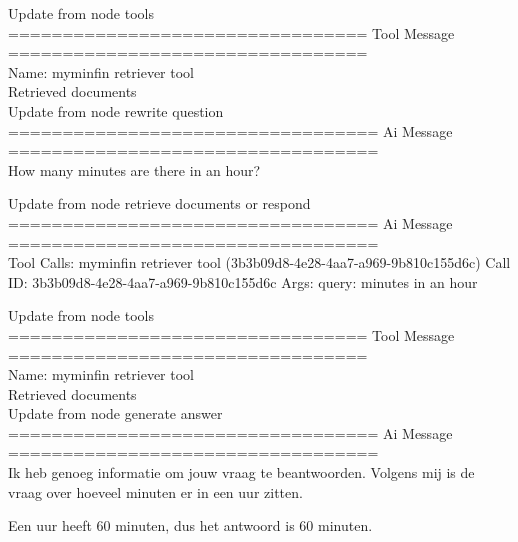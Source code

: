 Update from node tools
\\[1em]
================================= Tool Message =================================
\\[1em]
Name: myminfin  retriever  tool
\\[1em]
Retrieved documents
\\[1em]
Update from node rewrite  question
\\[1em]
================================== Ai Message ==================================
\\[1em]

How many minutes are there in an hour?



Update from node retrieve  documents  or  respond
\\[1em]
================================== Ai Message ==================================
\\[1em]
Tool Calls:
myminfin  retriever  tool (3b3b09d8-4e28-4aa7-a969-9b810c155d6c)
Call ID: 3b3b09d8-4e28-4aa7-a969-9b810c155d6c
Args:
query: minutes in an hour



Update from node tools
\\[1em]
================================= Tool Message =================================
\\[1em]
Name: myminfin  retriever  tool
\\[1em]
Retrieved documents
\\[1em]

Update from node generate  answer
\\[1em]
================================== Ai Message ==================================
\\[1em]

Ik heb genoeg informatie om jouw vraag te beantwoorden. Volgens mij is de vraag over hoeveel minuten er in een uur zitten.

Een uur heeft 60 minuten, dus het antwoord is 60 minuten.


